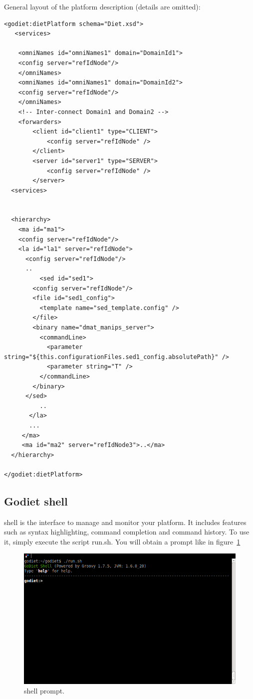 \vspace{1cm}

General layout of the \diet platform description (details are omitted):


\begin{verbatim}
<godiet:dietPlatform schema="Diet.xsd">
   <services>

    <omniNames id="omniNames1" domain="DomainId1">
	<config server="refIdNode"/>
    </omniNames>
    <omniNames id="omniNames1" domain="DomainId2">
	<config server="refIdNode"/>
    </omniNames>
    <!-- Inter-connect Domain1 and Domain2 -->
    <forwarders>
        <client id="client1" type="CLIENT">
            <config server="refIdNode" />
        </client>
        <server id="server1" type="SERVER">
            <config server="refIdNode" />
        </server>
  <services>


  <hierarchy>
    <ma id="ma1">
 	<config server="refIdNode"/>
	<la id="la1" server="refIdNode">
   	  <config server="refIdNode"/>          
   	  ..
          <sed id="sed1">
	    <config server="refIdNode"/>
	    <file id="sed1_config">
	      <template name="sed_template.config" />
	    </file>
	    <binary name="dmat_manips_server">
	      <commandLine>
	        <parameter string="${this.configurationFiles.sed1_config.absolutePath}" />
	        <parameter string="T" />
	      </commandLine>
	    </binary>
	  </sed>
          ..
       </la>
       ...
     </ma>
     <ma id="ma2" server="refIdNode3">..</ma>
  </hierarchy>

</godiet:dietPlatform>
\end{verbatim}


\subsection{Godiet shell}
\label{GODIETShell}

\godiet shell is the interface to manage and monitor your \diet platform. It includes features such as syntax highlighting, command completion and command history.
To use it, simply execute the script run.sh. You will obtain a prompt like in figure~\ref{fig:GODIETShell}

\begin{figure}[h]
  \centering
  \includegraphics[width=12cm]{fig/1-startup}
  \caption{\godiet shell prompt.\label{fig:GODIETShell}}
\end{figure} 


